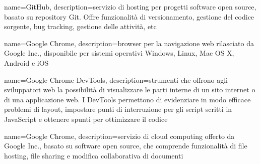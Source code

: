 {
	name=GitHub,
	description={servizio di hosting per progetti software open source, basato su repository Git. Offre funzionalità di versionamento, gestione del codice sorgente, bug tracking, gestione delle attività, etc}
}

{
	name=Google Chrome,
	description={browser per la navigazione web rilasciato da Google Inc., disponibile per sistemi operativi Windows, Linux, Mac OS X, Android e iOS}
}

{
	name=Google Chrome DevTools,
	description={strumenti che offrono agli sviluppatori web la possibilità di visualizzare le parti interne di un sito internet o di una applicazione web. I DevTools permettono di evidenziare in modo efficace problemi di layout, impostare punti di interruzione per gli script scritti in JavaScript e ottenere spunti per ottimizzare il codice}
}

{
	name=Google Chrome,
	description={servizio di cloud computing offerto da Google Inc., basato su software open source, che comprende funzionalità di file hosting, file sharing e modifica collaborativa di documenti}
}
